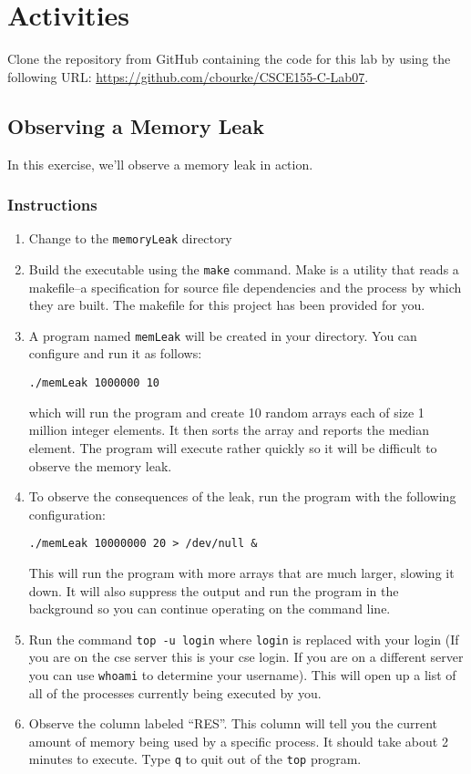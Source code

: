 \documentclass[12pt]{scrartcl}
\begin{document}
\section{Activities}

Clone the repository from GitHub containing the code for this lab by using 
the following URL: \url{https://github.com/cbourke/CSCE155-C-Lab07}.

\subsection{Observing a Memory Leak}

In this exercise, we'll observe a memory leak in action.

\subsubsection*{Instructions}
\begin{enumerate}
  \item Change to the \texttt{memoryLeak} directory
  \item Build the executable using the \texttt{make} command.  
  	Make is a utility that reads a makefile--a specification for source file 
	dependencies and the process by which they are built.  The makefile 
	for this project has been provided for you.
  \item A program named \texttt{memLeak} will be created in your 
	directory.  You can configure and run it as follows:
	
	\texttt{./memLeak 1000000 10}
	
	which will run the program and create 10 random arrays each of size
	1 million integer elements.  It then sorts the array and reports
	the median element.  The program will execute rather quickly so it
	will be difficult to observe the memory leak.

  \item To observe the consequences of the leak, run the program with
    the following configuration:	

	\texttt{./memLeak 10000000 20 > /dev/null &}
	
	This will run the program with more arrays that are much larger, 
	slowing it down.  It will also suppress the output and run the
	program in the background so you can continue operating on the
	command line.

  \item Run the command \texttt{top -u login} where \texttt{login}
	is replaced with your login (If you are on the cse server this is your
	cse login.  If you are on a different server you can use 
	\texttt{whoami} to determine your username).  This 
	will open up a list of all of the 
	processes currently being executed by you.  
	
  \item Observe the column labeled ``RES''.  This column will tell you 
    the current amount of memory being used by a specific process.  
    It should take about 2 minutes to execute.  Type \texttt{q}
    to quit out of the \texttt{top} program.
\end{enumerate}
\end{document}
